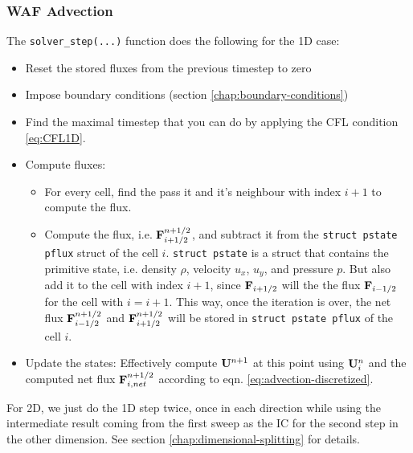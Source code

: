 \subsubsection{WAF Advection}


The \verb|solver_step(...)| function does the following for the 1D case:
\begin{itemize}
	\item 	Reset the stored fluxes from the previous timestep to zero
	\item 	Impose boundary conditions (section \ref{chap:boundary-conditions})
	\item 	Find the maximal timestep that you can do by applying the CFL condition \ref{eq:CFL1D}.
	\item 	Compute fluxes:
	\begin{itemize}
		\item 	For every cell, find the pass it and it's neighbour with index $i+1$ to compute the flux.
		\item 	Compute the flux, i.e. $ \mathbf{F}_{i+1/2}^{n+1/2} $, and subtract it from the \texttt{struct pstate pflux} struct of the cell $i$.
				\texttt{struct pstate} is a struct that contains the primitive state, i.e. density $\rho$, velocity $u_x$, $u_y$, and pressure $p$.
				But also add it to the cell with index $i+1$, since $\mathbf{F}_{i+1/2}$ will the the flux $\mathbf{F}_{i-1/2}$ for the cell with $i = i+1$.
				This way, once the iteration is over, the net flux $\mathbf{F}_{i-1/2}^{n+1/2}$ and $\mathbf{F}_{i+1/2}^{n+1/2}$ will be stored in \texttt{struct pstate pflux} of the cell $i$.
	\end{itemize}
	\item 	Update the states: Effectively compute $\mathbf{U}^{n+1}$ at this point using $\mathbf{U}_i^n$ and the computed net flux $\mathbf{F}_{i, net}^{n+1/2}$ according to eqn. \ref{eq:advection-discretized}.
\end{itemize}


For 2D, we just do the 1D step twice, once in each direction while using the intermediate result coming from the first sweep as the IC for the second step in the other dimension.
See section \ref{chap:dimensional-splitting} for details.

